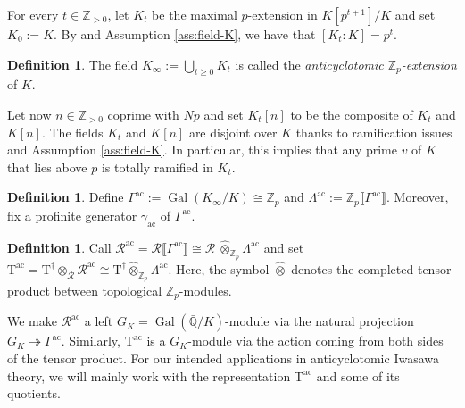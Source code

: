 \documentclass[12pt,reqno]{amsart}
\theoremstyle{definition}
\newtheorem{definition}[theorem]{Definition}
\theoremstyle{remark}
\newcommand{\numberset}{\mathbb}
\newcommand{\Q}{\numberset{Q}}
\newcommand{\Z}{\numberset{Z}}
\newcommand{\T}{\boldsymbol{\mathrm{T}}}
\DeclareMathOperator{\Gal}{Gal}
\newcommand{\ac}{\mathrm{ac}}
\newcommand{\gL}{\Lambda}
\begin{document}
For every $t\in\Z_{>0}$, let $K_t$ be the maximal $p$-extension in $K[p^{t+1}]/K$ and set $K_0:=K$. By \cite[Theorem 7.24]{Cox22:primes-of-the-form} and Assumption \ref{ass:field-K}, we have that $[K_t:K]=p^t$. 

\begin{definition}
    The field $K_{\infty}:=\bigcup_{t\ge 0} K_t$ is called the \emph{anticyclotomic $\Z_p$-extension} of $K$.
\end{definition}

Let now $n\in\Z_{>0}$ coprime with $Np$ and set $K_t[n]$ to be the composite of $K_t$ and $K[n]$. The fields $K_t$ and $K[n]$ are disjoint over $K$ thanks to ramification issues and Assumption \ref{ass:field-K}. In particular, this implies that any prime $v$ of $K$ that lies above $p$ is totally ramified in $K_{t}$.

\begin{definition}
     Define $\Gamma^{\ac}:=\Gal(K_{\infty}/K)\cong \Z_p$ and $\gL^{\ac}:=\Z_p\llbracket \Gamma^{\ac}\rrbracket$. Moreover, fix a profinite generator $\gamma_{\ac}$ of $\Gamma^{\ac}$.
\end{definition}

\begin{definition}
    Call $\mathcal{R}^{\ac}=\mathcal{R}\llbracket \Gamma^{\ac}\rrbracket\cong\mathcal{R} \ \hat{\otimes}_{\Z_p} \gL^{\ac}$ and set $\T^{\ac}=\T^{\dag}\otimes_{\mathcal{R}}\mathcal{R}^{\ac}\cong\T^{\dag}\hat{\otimes}_{\Z_p}\gL^{\ac}$. Here, the symbol $\hat{\otimes}$ denotes the completed tensor product between topological $\Z_p$-modules.
\end{definition}

We make $\mathcal{R}^{\ac}$ a left $G_K=\Gal(\bar{\Q}/K)$-module via the natural projection $G_K\twoheadrightarrow \Gamma^{\ac}$. Similarly, $\T^{\ac}$ is a $G_K$-module via the action coming from both sides of the tensor product. For our intended applications in anticyclotomic Iwasawa theory, we will mainly work with the representation $\T^{\ac}$ and some of its quotients.
\end{document}
